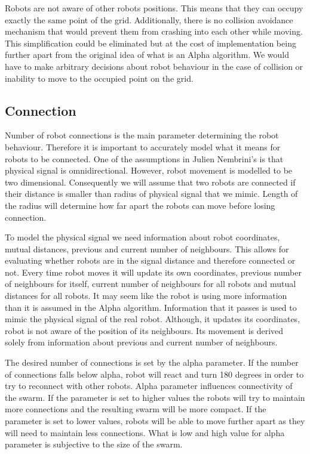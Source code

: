 Robots are not aware of other robots positions. This means that they can occupy exactly the same point of the grid. Additionally, there is no collision avoidance mechanism that would prevent them from crashing into each other while moving. This simplification could be eliminated but at the cost of implementation being further apart from the original idea of what is an Alpha algorithm. We would have to make arbitrary decisions about robot behaviour in the case of collision or inability to move to the occupied point on the grid.

\subsection{Connection}
Number of robot connections is the main parameter determining the robot behaviour. Therefore it is important to accurately model what it means for robots to be connected. One of the assumptions in Julien Nembrini's \cite{Minimalist_Coherent_Swarming_of_Wireless_Networked_Autonomous_Mobile_Robots} is that physical signal is omnidirectional. However, robot movement is modelled to be two dimensional. Consequently we will assume that two robots are connected if their distance is smaller than radius of physical signal that we mimic. Length of the radius will determine how far apart the robots can move before losing connection.

To model the physical signal we need information about robot coordinates, mutual distances, previous and current number of neighbours. This allows for evaluating whether robots are in the signal distance and therefore connected or not. Every time robot moves it will update its own coordinates, previous number of neighbours for itself, current number of neighbours for all robots and mutual distances for all robots. It may seem like the robot is using more information than it is assumed in the Alpha algorithm. Information that it passes is used to mimic the physical signal of the real robot. Although, it updates its coordinates, robot is not aware of the position of its neighbours. Its movement is derived solely from information about previous and current number of neighbours. 

The desired number of connections is set by the alpha parameter. If the number of connections falls below alpha, robot will react and turn 180 degrees in order to try to reconnect with other robots. Alpha parameter influences connectivity of the swarm. If the parameter is set to higher values the robots will try to maintain more connections and the resulting swarm will be more compact. If the parameter is set to lower values, robots will be able to move further apart as they will need to maintain less connections. What is low and high value for alpha parameter is subjective to the size of the swarm.

